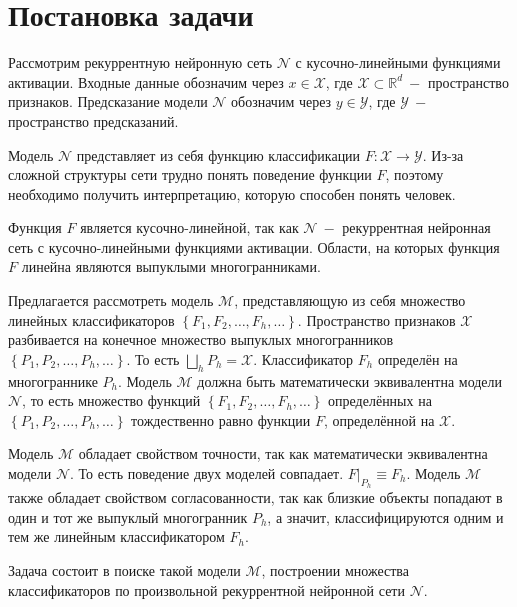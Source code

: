 \documentclass[12pt]{article}
\begin{document}
\section{Постановка задачи}
Рассмотрим рекуррентную нейронную сеть $\mathcal{N}$ с кусочно-линейными функциями активации. Входные данные обозначим через $x \in \mathcal{X}$, где $\mathcal{X} \subset \mathbb{R}^d~-$ пространство признаков. Предсказание модели $\mathcal{N}$ обозначим через $y \in \mathcal{Y}$, где $\mathcal{Y}~-$ пространство предсказаний.

Модель $\mathcal{N}$ представляет из себя функцию классификации $F: \mathcal{X} \to \mathcal{Y}$. Из-за сложной структуры сети трудно понять поведение функции $F$, поэтому необходимо получить интерпретацию, которую способен понять человек.

Функция $F$ является кусочно-линейной, так как $\mathcal{N}~-$ рекуррентная нейронная сеть с кусочно-линейными функциями активации. Области, на которых функция $F$ линейна являются выпуклыми многогранниками.

Предлагается рассмотреть модель $\mathcal{M}$, представляющую из себя множество линейных классификаторов $\left\{F_1, F_2, \dots, F_h, \dots\right\}$. Пространство признаков $\mathcal{X}$ разбивается на конечное множество выпуклых многогранников $\left\{P_1, P_2, \dots, P_h, \dots\right\}$. То есть $\bigsqcup\limits_{h} P_h=\mathcal{X}$. Классификатор $F_h$ определён на многограннике $P_h$. Модель $\mathcal{M}$ должна быть математически эквивалентна модели $\mathcal{N}$, то есть множество функций $\left\{F_1, F_2, \dots, F_h, \dots\right\}$ определённых на $\left\{P_1, P_2, \dots, P_h, \dots\right\}$ тождественно равно функции $F$, определённой на $\mathcal{X}$.

Модель $\mathcal{M}$ обладает свойством точности, так как математически эквивалентна модели $\mathcal{N}$. То есть поведение двух моделей совпадает. $F|_{P_h} \equiv F_h$. Модель $\mathcal{M}$ также обладает свойством согласованности, так как близкие объекты попадают в один и тот же выпуклый многогранник $P_h$, а значит, классифицируются одним и тем же линейным классификатором $F_h$.

Задача состоит в поиске такой модели $\mathcal{M}$, построении множества классификаторов по произвольной рекуррентной нейронной сети $\mathcal{N}$.



\end{document}
